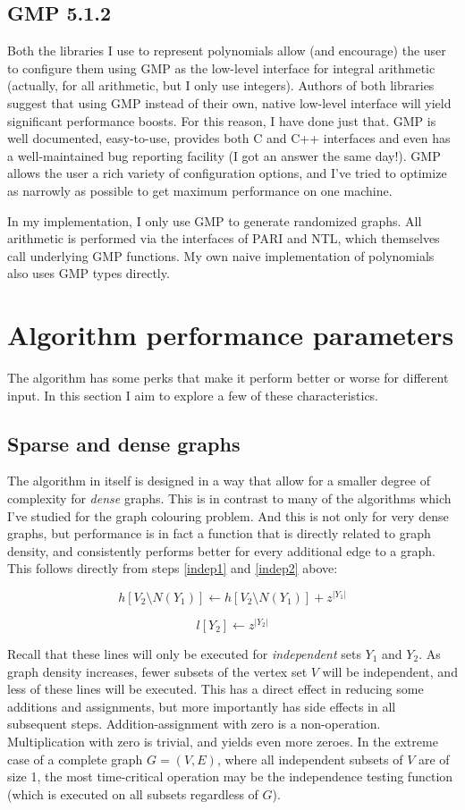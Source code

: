 \documentclass[a4paper]{article}
\begin{document}
\subsection{GMP 5.1.2}
Both the libraries I use to represent polynomials allow (and encourage) the user to configure them using GMP\cite{gmp} as the low-level interface for integral arithmetic (actually, for all arithmetic, but I only use integers). Authors of both libraries suggest that using GMP instead of their own, native low-level interface will yield significant performance boosts. For this reason, I have done just that. GMP is well documented, easy-to-use, provides both C and C++ interfaces and even has a well-maintained bug reporting facility (I got an answer the same day!). GMP allows the user a rich variety of configuration options, and I've tried to optimize as narrowly as possible to get maximum performance on one machine.

In my implementation, I only use GMP to generate randomized graphs. All arithmetic is performed via the interfaces of PARI and NTL, which themselves call underlying GMP functions. My own naive implementation of polynomials also uses GMP types directly.

\section{Algorithm performance parameters}
The algorithm has some perks that make it perform better or worse for different input. In this section I aim to explore a few of these characteristics.

\subsection{Sparse and dense graphs}\label{sparsedense}
The algorithm in itself is designed in a way that allow for a smaller degree of complexity for \emph{dense} graphs. This is in contrast to many of the algorithms which I've studied for the graph colouring problem. And this is not only for very dense graphs, but performance is in fact a function that is directly related to graph density, and consistently performs better for every additional edge to a graph. This follows directly from steps \ref{indep1} and \ref{indep2} above:

$$ h[V_2 \setminus N(Y_1)] \leftarrow h[V_2 \setminus N(Y_1)] + z^{|Y_1|} $$

$$ l[Y_2] \leftarrow z^{|Y_2|} $$

Recall that these lines will only be executed for \emph{independent} sets $Y_1$ and $Y_2$. As graph density increases, fewer subsets of the vertex set $V$ will be independent, and less of these lines will be executed. This has a direct effect in reducing some additions and assignments, but more importantly has side effects in all subsequent steps. Addition-assignment with zero is a non-operation. Multiplication with zero is trivial, and yields even more zeroes. In the extreme case of a complete graph $G=(V,E)$, where all independent subsets of $V$ are of size 1, the most time-critical operation may be the independence testing function (which is executed on all subsets regardless of $G$).
\end{document}
